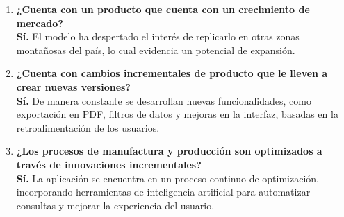 \begin{enumerate}
\item \textbf{¿Cuenta con un producto que cuenta con un crecimiento de mercado?} \\
\textbf{Sí.} El modelo ha despertado el interés de replicarlo en otras zonas montañosas del país, lo cual evidencia un potencial de expansión.

\item \textbf{¿Cuenta con cambios incrementales de producto que le lleven a crear nuevas versiones?} \\
\textbf{Sí.} De manera constante se desarrollan nuevas funcionalidades, como exportación en PDF, filtros de datos y mejoras en la interfaz, basadas en la retroalimentación de los usuarios.

\item \textbf{¿Los procesos de manufactura y producción son optimizados a través de innovaciones incrementales?} \\
\textbf{Sí.} La aplicación se encuentra en un proceso continuo de optimización, incorporando herramientas de inteligencia artificial para automatizar consultas y mejorar la experiencia del usuario.

\end{enumerate}





